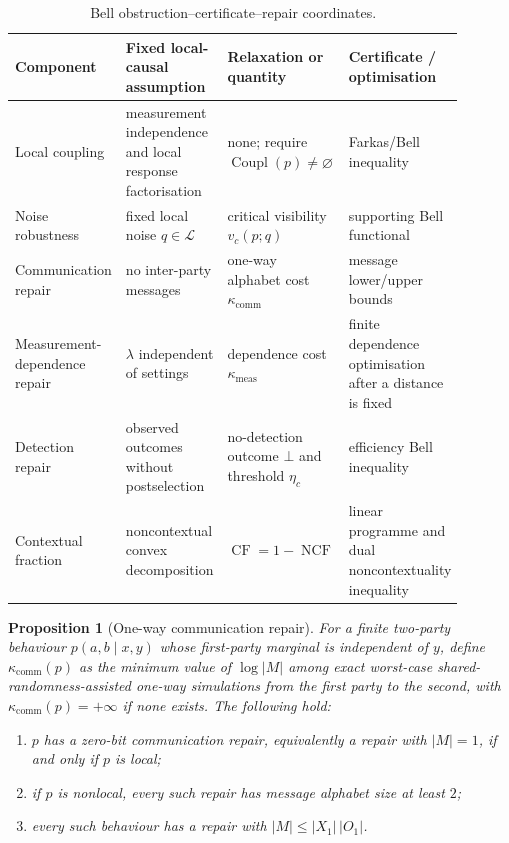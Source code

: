 \documentclass[11pt]{article}
\theoremstyle{plain}
\newtheorem{proposition}[theorem]{Proposition}
\theoremstyle{definition}
\theoremstyle{remark}
\begin{document}
\begin{table}[htbp]
\centering
\caption{Bell obstruction--certificate--repair coordinates.}
\label{tab:bell-repair}
\begin{tabular}{@{}p{0.18\linewidth}p{0.25\linewidth}p{0.22\linewidth}p{0.24\linewidth}@{}}
\toprule
Component & Fixed local-causal assumption & Relaxation or quantity & Certificate / optimisation\\
\midrule
Local coupling & measurement independence and local response factorisation &
none; require $\operatorname{Coupl}(p)\ne\varnothing$ & Farkas/Bell inequality\\
Noise robustness & fixed local noise $q\in\mathcal L$ & critical visibility
$v_c(p;q)$ & supporting Bell functional\\
Communication repair & no inter-party messages & one-way alphabet cost
$\kappa_{\mathrm{comm}}$ & message lower/upper bounds\\
Measurement-dependence repair & $\lambda$ independent of settings & dependence
cost $\kappa_{\mathrm{meas}}$ & finite dependence optimisation after a distance is fixed\\
Detection repair & observed outcomes without postselection & no-detection
outcome $\bot$ and threshold $\eta_c$ & efficiency Bell inequality\\
Contextual fraction & noncontextual convex decomposition &
$\operatorname{CF}=1-\operatorname{NCF}$ & linear programme and dual noncontextuality inequality\\
\bottomrule
\end{tabular}
\end{table}

\begin{proposition}[One-way communication repair]
\label{prop:communication-repair}
For a finite two-party behaviour \(p(a,b\mid x,y)\) whose first-party marginal is
independent of \(y\), define \(\kappa_{\mathrm{comm}}(p)\) as the minimum value
of \(\log |M|\) among exact worst-case shared-randomness-assisted one-way
simulations from the first party to the second, with
\(\kappa_{\mathrm{comm}}(p)=+\infty\) if none exists. The
following hold:
\begin{enumerate}[label=(\roman*)]
\item \(p\) has a zero-bit communication repair, equivalently a repair with
\(|M|=1\), if and only if \(p\) is local;
\item if \(p\) is nonlocal, every such repair has message alphabet size at least
\(2\);
\item every such behaviour has a repair with \(|M|\le |X_1|\,|O_1|\).
\end{enumerate}
\end{proposition}
\end{document}
